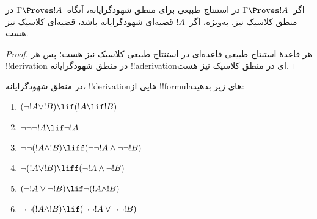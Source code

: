 \documentclass[../../../include/open-logic-section]{subfiles}
\begin{document}
\begin{prop}
  اگر~$\Gamma \Proves !A$ در استنتاج طبیعی برای منطق شهودگرایانه،
  آنگاه~$\Gamma \Proves !A$ در منطق کلاسیک نیز. به‌ویژه، اگر~$!A$
  قضیه‌ای شهودگرایانه باشد، قضیه‌ای کلاسیک نیز هست.
\end{prop}

\begin{proof}
  هر قاعدهٔ استنتاج طبیعی قاعده‌ای در استنتاج طبیعی کلاسیک نیز هست؛ پس
  هر !!{derivation} در منطق شهودگرایانه !!a{derivation}ای در منطق
  کلاسیک نیز هست.
\end{proof}

\begin{prob}
  در منطق شهودگرایانه، !!{derivation}هایی از !!{formula}های زیر بدهید:
  \begin{enumerate}
    \item $(\lnot !A \lor !B) \lif (!A \lif !B)$
    \item $\lnot\lnot\lnot !A \lif \lnot !A$
    \item $\lnot\lnot (!A \land !B) \liff (\lnot\lnot !A\land \lnot \lnot !B)$
    \item $\lnot (!A \lor !B) \liff (\lnot !A \land \lnot !B)$
    \item $(\lnot !A \lor \lnot !B) \lif \lnot (!A \land !B)$
    \item $\lnot\lnot ( !A \land !B) \lif  (\lnot\lnot !A \lor
    \lnot\lnot !B)$
  \end{enumerate}
\end{prob}
\end{document}
